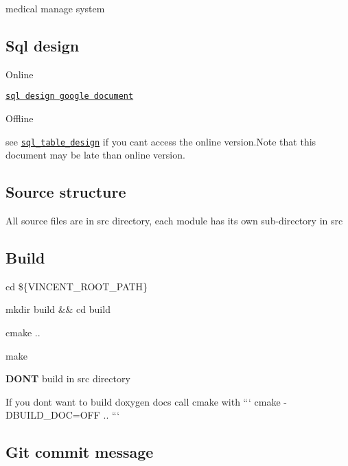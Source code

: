 medical manage system

\subsection*{Sql design}


\begin{DoxyItemize}
\item Online

\href{https://docs.google.com/document/d/1QlFliN9hr0bRWUpu1whWGgTl2qbUMroOrxDV7gtdL20/edit}{\tt sql design google document}
\item Offline

see \href{https://htmlpreview.github.io/?https://github.com/advanced-data-processing-company/vincent/blob/master/sql_table_design.html}{\tt sql\+\_\+table\+\_\+design} if you can\textquotesingle{}t access the online version.\+Note that this document may be late than online version. \subsection*{Source structure}
\end{DoxyItemize}

All source files are in {\ttfamily src} directory, each module has its own sub-\/directory in {\ttfamily src}

\subsection*{Build}


\begin{DoxyEnumerate}
\item {\ttfamily cd \$\{V\+I\+N\+C\+E\+N\+T\+\_\+\+R\+O\+O\+T\+\_\+\+P\+A\+TH\}}
\item {\ttfamily mkdir build \&\& cd build}
\item {\ttfamily cmake ..}
\item {\ttfamily make}
\end{DoxyEnumerate}
\begin{DoxyItemize}
\item {\bfseries D\+O\+NT} build in {\ttfamily src} directory
\item If you dont want to build {\ttfamily doxygen docs} call cmake with ``` cmake -\/\+D\+B\+U\+I\+L\+D\+\_\+\+D\+OC=O\+FF .. ```
\end{DoxyItemize}

\subsection*{Git commit message}

